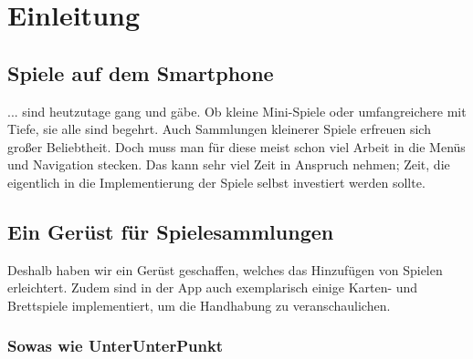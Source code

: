 \chapter{Einleitung}

\section{Spiele auf dem Smartphone}
... sind heutzutage gang und gäbe. Ob kleine Mini-Spiele oder umfangreichere mit
Tiefe, sie alle sind begehrt. Auch Sammlungen kleinerer Spiele erfreuen sich
großer Beliebtheit.  Doch muss man für diese meist schon viel Arbeit in die
Menüs und Navigation stecken. Das kann sehr viel Zeit in Anspruch nehmen; Zeit,
die eigentlich in die Implementierung der Spiele selbst investiert werden
sollte.

\section{Ein Gerüst für Spielesammlungen}
Deshalb haben wir ein Gerüst geschaffen, welches das Hinzufügen von Spielen
erleichtert. Zudem sind in der App auch exemplarisch einige Karten- und
Brettspiele implementiert, um die Handhabung zu veranschaulichen.

\subsection{Sowas wie UnterUnterPunkt}
